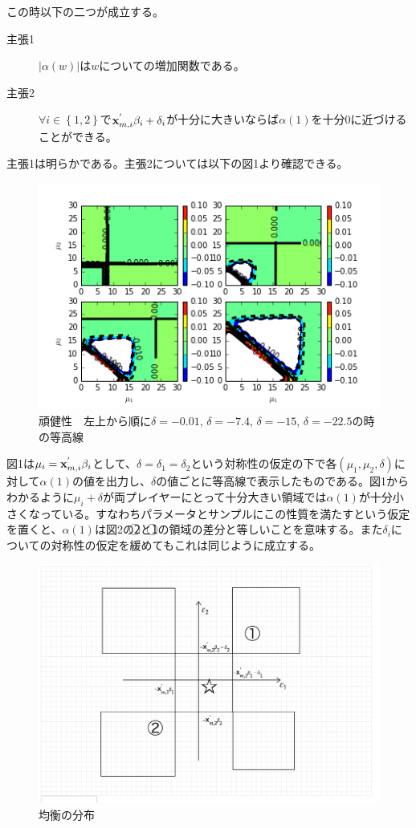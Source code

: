 \documentclass{jsarticle}
\begin{document}
この時以下の二つが成立する。
\begin{description}
	\item[主張1] $\left| \alpha(w) \right|$は$w$についての増加関数である。
	\item[主張2] $\forall i \in \left\{ 1,2\right\}$で${\bf x}_{m, i}^{'} \beta_i + \delta_i$が十分に大きいならば$\alpha(1)$を十分0に近づけることができる。
\end{description}

主張1は明らかである。主張2については以下の図1より確認できる。

\begin{figure}[t]
\centering
\includegraphics{diff3.png}
\caption{頑健性　左上から順に$\delta = -0.01$, $\delta = -7.4$, $\delta = -15$, $\delta = -22.5$の時の等高線}
\end{figure}

図1は$\mu_i = {\bf x}_{m, i}^{'} \beta_i$として、$\delta = \delta_1 = \delta_2$という対称性の仮定の下で各$(\mu_1, \mu_2, \delta)$に対して$\alpha(1)$の値を出力し、$\delta$の値ごとに等高線で表示したものである。図1からわかるように$\mu_i + \delta$が両プレイヤーにとって十分大きい領域では$\alpha(1)$が十分小さくなっている。すなわちパラメータとサンプルにこの性質を満たすという仮定を置くと、$\alpha(1)$は図2の\textcircled{\scriptsize 2}と\textcircled{\scriptsize 1}の領域の差分と等しいことを意味する。また$\delta_i$についての対称性の仮定を緩めてもこれは同じように成立する。

\begin{figure}[t]
\centering
\includegraphics[scale = 0.3]{brgraph.png}
\caption{均衡の分布}
\end{figure}
\end{document}
